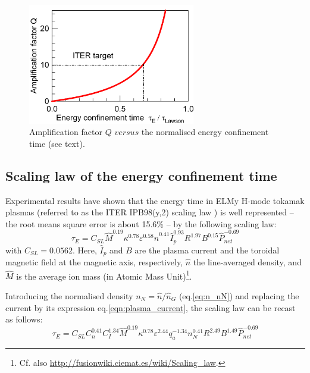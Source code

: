\begin{figure} 
	\begin{center}
		\includegraphics[width=0.65\textwidth]{figures/Graph_Qfactor_tauE.png}
		\caption{Amplification factor $Q$ $versus$ the normalised energy confinement time (see text).}
		\label{fig:Q_tauE}
	\end{center}
\end{figure}


\subsection{Scaling law of the energy confinement time}
\label{sec:scaling_law}

Experimental results have shown that the energy time in ELMy H-mode tokamak plasmas (referred to as the ITER IPB98(y,2) scaling law \cite[eq.(20)]{ITERphysics_chap2}) is well represented -- the root means square error is about 15.6\% -- by the following scaling law:
\begin{equation*}
  \tau_E = C_{SL} \hat M^{0.19} \kappa^{0.78} \varepsilon^{0.58} 
  \hat n^{0.41} \hat I_p^{0.93} R^{1.97} B^{0.15}  \hat P_{net}^{-0.69}
\end{equation*}
with $C_{SL} = 0.0562$.
Here, $\hat I_p$ and $B$ are the plasma current and the toroidal magnetic field at the magnetic axis, respectively, $\hat n$ the line-averaged density, and $\hat M$ is the average ion mass (in Atomic Mass Unit)\footnote{Cf. also \url{http://fusionwiki.ciemat.es/wiki/Scaling_law}.}. 

Introducing the normalised density $n_N = \hat n/\hat n_G$ (eq.\ref{eq:n_nN}) and replacing the current by its expression eq.\ref{eqn:plasma_current}, the scaling law can be recast as follows:
\begin{equation*}
  \tau_E = C_{SL} C_n^{0.41} C_I^{1.34} \hat M^{0.19} \kappa^{0.78} \varepsilon^{2.44} q_a^{-1.34}
  n_N^{0.41} R^{2.49} B^{1.49} \hat P_{net}^{-0.69}
\end{equation*}

